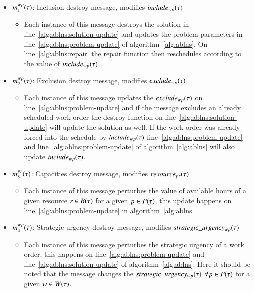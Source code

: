 \begin{itemize}
	\item $m^{wp}_{1}(\tau)$: Inclusion destroy message, modifies $include_{wp}(\tau)$	
	\begin{itemize}
		\item Each instance of this message destroys the solution in line~\ref{alg:ablns:solution-update} 
			and updates the problem parameters in line~\ref{alg:ablns:problem-update} of algorithm~\ref{alg:ablns}.
			On line~\ref{alg:ablns:repair} the repair function then reschedules according to the value of $include_{wp}(\tau)$.
	\end{itemize}
	\item $m^{wp}_{2}(\tau)$: Exclusion destroy message, modifies $exclude_{wp}(\tau)$
	\begin{itemize}
		\item Each instance of this message updates the $exclude_{wp}(\tau)$ on line~\ref{alg:ablns:problem-update}
			and if the message excludes an already scheduled work order the destroy function on line~\ref{alg:ablns:solution-update}
			will update the solution as well. If the work order was already forced into the schedule by $include_{wp}(\tau)$ line~\ref{alg:ablns:problem-update}
			and line~\ref{alg:ablns:problem-update} of algorithm~\ref{alg:ablns} will also update $include_{wp}(\tau)$.
	\end{itemize}
	\item $m^{pr}_{3}(\tau)$: Capacities destroy message, modifies $resource_{pr}(\tau)$
	\begin{itemize}
		\item Each instance of this message perturbes the value of available hours of a given resource $r \in R(\tau)$ for
			a given $p \in P(\tau)$, this update happens on line~\ref{alg:ablns:problem-update} in algorithm~\ref{alg:ablns}.
	\end{itemize}
	\item $m^{wp}_{4}(\tau)$: Strategic urgency destroy message, modifies $strategic\_urgency_{wp}(\tau)$
	\begin{itemize}
		\item Each instance of this message perturbes the strategic urgency of a work order, this happens on line~\ref{alg:ablns:problem-update} and
		line~\ref{alg:ablns:solution-update} of algorithm~\ref{alg:ablns}. Here it should be noted that the
			message changes the $strategic\_urgency_{wp}(\tau)$ $\forall p \in P(\tau)$ for a given $\ElementWorkOrder \in \SetWorkOrder$. 

\end{itemize}
\end{itemize}
